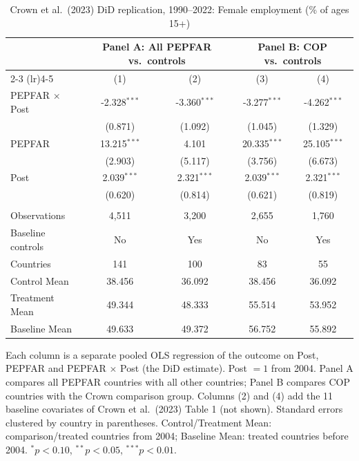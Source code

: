 
\begin{table}[htbp]
   \caption{\label{tab:crown_did_emp_female} Crown et al.\ (2023) DiD replication, 1990--2022: Female employment (\% of ages 15+)}
   \bigskip
   \centering
   \begin{tabular}{lcccc}
      \toprule
       & \multicolumn{2}{c}{Panel A: All PEPFAR vs.\ controls} & \multicolumn{2}{c}{Panel B: COP vs.\ controls} \\ \cmidrule(lr){2-3} \cmidrule(lr){4-5}
                            & (1)            & (2)            & (3)            & (4)\\  
      \midrule 
      PEPFAR $\times$ Post  & -2.328$^{***}$ & -3.360$^{***}$ & -3.277$^{***}$ & -4.262$^{***}$\\   
                            & (0.871)        & (1.092)        & (1.045)        & (1.329)\\   
      PEPFAR                & 13.215$^{***}$ & 4.101          & 20.335$^{***}$ & 25.105$^{***}$\\   
                            & (2.903)        & (5.117)        & (3.756)        & (6.673)\\   
      Post                  & 2.039$^{***}$  & 2.321$^{***}$  & 2.039$^{***}$  & 2.321$^{***}$\\   
                            & (0.620)        & (0.814)        & (0.621)        & (0.819)\\   
       \\
      Observations          & 4,511          & 3,200          & 2,655          & 1,760\\  
      Baseline controls     & No             & Yes            & No             & Yes\\  
      Countries             & 141            & 100            & 83             & 55\\  
      Control Mean          & 38.456         & 36.092         & 38.456         & 36.092\\  
      Treatment Mean        & 49.344         & 48.333         & 55.514         & 53.952\\  
      Baseline Mean         & 49.633         & 49.372         & 56.752         & 55.892\\  
      \bottomrule
   \end{tabular}
   
   \par \raggedright 
   Each column is a separate pooled OLS regression of the outcome on Post, PEPFAR and PEPFAR $\times$ Post (the DiD estimate). Post $= 1$ from 2004. Panel A compares all PEPFAR countries with all other countries; Panel B compares COP countries with the Crown comparison group. Columns (2) and (4) add the 11 baseline covariates of Crown et al.\ (2023) Table 1 (not shown). Standard errors clustered by country in parentheses. Control/Treatment Mean: comparison/treated countries from 2004; Baseline Mean: treated countries before 2004. $^{*}p<0.10$, $^{**}p<0.05$, $^{***}p<0.01$.
\end{table}


